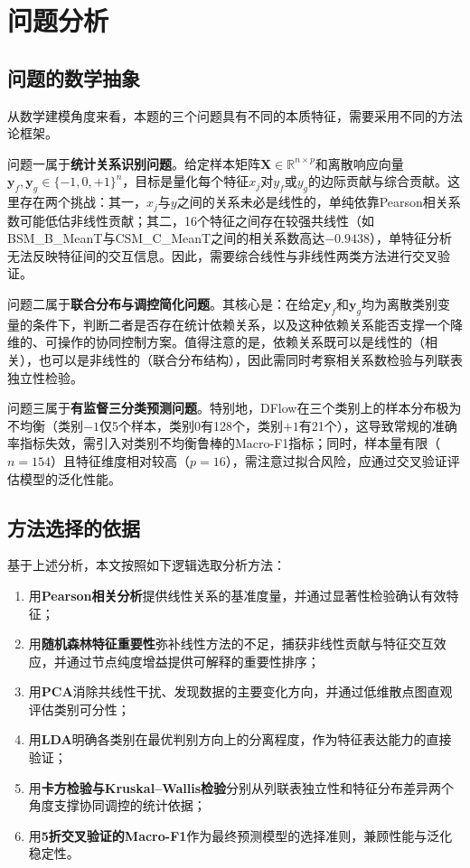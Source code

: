 \documentclass[UTF8,a4paper,12pt]{ctexart}
\begin{document}
\section{问题分析}

\subsection{问题的数学抽象}

从数学建模角度来看，本题的三个问题具有不同的本质特征，需要采用不同的方法论框架。

问题一属于\textbf{统计关系识别问题}。给定样本矩阵$\bm{X}\in\mathbb{R}^{n\times p}$和离散响应向量$\bm{y}_f,\bm{y}_g\in\{-1,0,+1\}^n$，目标是量化每个特征$x_j$对$y_f$或$y_g$的边际贡献与综合贡献。这里存在两个挑战：其一，$x_j$与$y$之间的关系未必是线性的，单纯依靠Pearson相关系数可能低估非线性贡献；其二，16个特征之间存在较强共线性（如BSM\_B\_MeanT与CSM\_C\_MeanT之间的相关系数高达$-0.9438$），单特征分析无法反映特征间的交互信息。因此，需要综合线性与非线性两类方法进行交叉验证。

问题二属于\textbf{联合分布与调控简化问题}。其核心是：在给定$\bm{y}_f$和$\bm{y}_g$均为离散类别变量的条件下，判断二者是否存在统计依赖关系，以及这种依赖关系能否支撑一个降维的、可操作的协同控制方案。值得注意的是，依赖关系既可以是线性的（相关），也可以是非线性的（联合分布结构），因此需同时考察相关系数检验与列联表独立性检验。

问题三属于\textbf{有监督三分类预测问题}。特别地，DFlow在三个类别上的样本分布极为不均衡（类别$-1$仅5个样本，类别$0$有128个，类别$+1$有21个），这导致常规的准确率指标失效，需引入对类别不均衡鲁棒的Macro-F1指标；同时，样本量有限（$n=154$）且特征维度相对较高（$p=16$），需注意过拟合风险，应通过交叉验证评估模型的泛化性能。

\subsection{方法选择的依据}

基于上述分析，本文按照如下逻辑选取分析方法：
\begin{enumerate}[label=(\arabic*),leftmargin=2em]
\item 用\textbf{Pearson相关分析}提供线性关系的基准度量，并通过显著性检验确认有效特征；
\item 用\textbf{随机森林特征重要性}弥补线性方法的不足，捕获非线性贡献与特征交互效应，并通过节点纯度增益提供可解释的重要性排序；
\item 用\textbf{PCA}消除共线性干扰、发现数据的主要变化方向，并通过低维散点图直观评估类别可分性；
\item 用\textbf{LDA}明确各类别在最优判别方向上的分离程度，作为特征表达能力的直接验证；
\item 用\textbf{卡方检验与Kruskal--Wallis检验}分别从列联表独立性和特征分布差异两个角度支撑协同调控的统计依据；
\item 用\textbf{5折交叉验证的Macro-F1}作为最终预测模型的选择准则，兼顾性能与泛化稳定性。
\end{enumerate}
\end{document}
